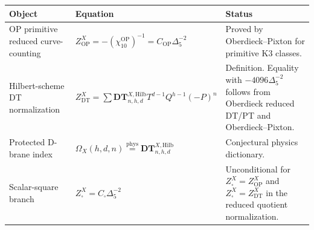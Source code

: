 \begin{center}
\small
\begin{tabular}{p{}p{}p{}}
\hline
Object & Equation & Status \\
\hline
OP primitive reduced curve-counting &
\(Z^X_{\mathrm{OP}}=-(\chi_{10}^{\mathrm{OP}})^{-1}
=C_{\mathrm{OP}}\Delta_5^{-2}\) &
Proved by Oberdieck--Pixton for primitive K3 classes. \\
Hilbert-scheme DT normalization &
\(Z^X_{\mathrm{DT}}
=\sum \mathbf{DT}^{X,\mathrm{Hilb}}_{n,h,d}
T^{d-1}Q^{h-1}(-P)^n\) &
Definition.  Equality with \(-4096\Delta_5^{-2}\) follows from
Oberdieck reduced DT/PT and Oberdieck--Pixton. \\
Protected D-brane index &
\(\Omega_X(h,d,n)\stackrel{\mathrm{phys}}{=}
\mathbf{DT}^{X,\mathrm{Hilb}}_{n,h,d}\) &
Conjectural physics dictionary. \\
Scalar-square branch &
\(Z^X_\square=C_\square\Delta_5^{-2}\) &
Unconditional for \(Z^X_\square=Z^X_{\mathrm{OP}}\) and
\(Z^X_\square=Z^X_{\mathrm{DT}}\) in the reduced quotient
normalization. \\
\hline
\end{tabular}
\end{center}
